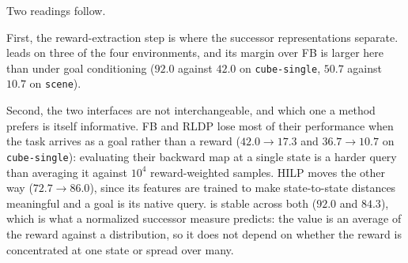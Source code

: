 Two readings follow.

First, the reward-extraction step is where the successor representations separate.
\name{} leads on three of the four environments, and its margin over FB is larger here than under goal conditioning ($92.0$ against $42.0$ on \texttt{cube-single}, $50.7$ against $10.7$ on \texttt{scene}).

Second, the two interfaces are not interchangeable, and which one a method prefers is itself informative.
FB and RLDP lose most of their performance when the task arrives as a goal rather than a reward ($42.0\to17.3$ and $36.7\to10.7$ on \texttt{cube-single}): evaluating their backward map at a single state is a harder query than averaging it against $10^4$ reward-weighted samples.
HILP moves the other way ($72.7\to86.0$), since its features are trained to make state-to-state distances meaningful and a goal is its native query.
\name{} is stable across both ($92.0$ and $84.3$), which is what a normalized successor measure predicts: the value is an average of the reward against a distribution, so it does not depend on whether the reward is concentrated at one state or spread over many.
